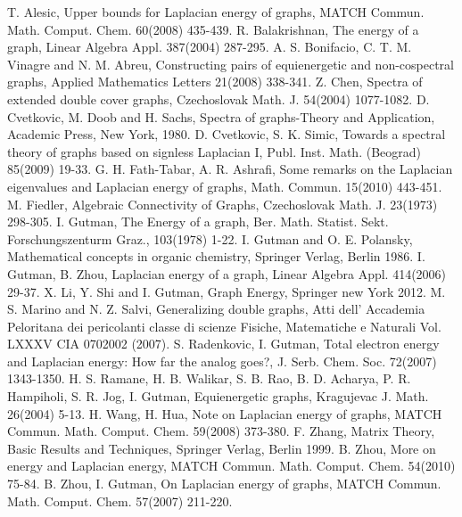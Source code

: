 \documentclass[12pt,a4paper]{amsart}
\theoremstyle{theorem}
\theoremstyle{definition}
\numberwithin{equation}{section} \makeatletter
\begin{document}
\begin{thebibliography}{90}
 T. Alesic, Upper bounds for Laplacian energy of graphs, MATCH Commun. Math. Comput. Chem. 60(2008) 435-439.
 R. Balakrishnan, The energy of a graph, Linear Algebra Appl. 387(2004) 287-295.
 A. S. Bonifacio, C. T. M. Vinagre and N. M. Abreu, Constructing pairs of equienergetic and non-cospectral graphs, Applied Mathematics Letters 21(2008) 338-341.
 Z. Chen, Spectra of extended double cover graphs, Czechoslovak Math. J. 54(2004) 1077-1082.
 D. Cvetkovic, M. Doob and H. Sachs, Spectra of graphs-Theory and Application, Academic Press, New York, 1980.
 D. Cvetkovic, S. K. Simic, Towards a spectral theory of graphs based on signless Laplacian I, Publ. Inst. Math. (Beograd) 85(2009) 19-33.
 G. H. Fath-Tabar, A. R. Ashrafi, Some remarks on the Laplacian eigenvalues and Laplacian energy of graphs, Math. Commun. 15(2010) 443-451.
 M. Fiedler, Algebraic Connectivity of Graphs, Czechoslovak Math. J. 23(1973) 298-305.
 I. Gutman, The Energy of a graph, Ber. Math. Statist. Sekt. Forschungszenturm Graz., 103(1978) 1-22.
 I. Gutman and O. E. Polansky, Mathematical concepts in organic chemistry, Springer Verlag, Berlin 1986.
 I. Gutman, B. Zhou, Laplacian energy of a graph, Linear Algebra Appl. 414(2006) 29-37.
 X. Li, Y. Shi and I. Gutman, Graph Energy, Springer new York 2012.
 M. S. Marino and N. Z. Salvi, Generalizing double graphs, Atti dell' Accademia Peloritana dei pericolanti classe di scienze Fisiche, Matematiche e Naturali Vol. LXXXV CIA 0702002 (2007).
 S. Radenkovic, I. Gutman, Total electron energy and Laplacian energy: How far the analog goes?, J. Serb. Chem. Soc. 72(2007) 1343-1350.
 H. S. Ramane, H. B. Walikar, S. B. Rao, B. D. Acharya, P. R. Hampiholi, S. R. Jog, I. Gutman, Equienergetic graphs, Kragujevac J. Math. 26(2004) 5-13.
 H. Wang, H. Hua, Note on Laplacian energy of graphs,  MATCH Commun. Math. Comput. Chem. 59(2008) 373-380.
 F. Zhang, Matrix Theory, Basic Results and Techniques, Springer Verlag, Berlin 1999.
 B. Zhou, More on energy and Laplacian energy, MATCH Commun. Math. Comput. Chem. 54(2010) 75-84.
 B. Zhou, I. Gutman, On Laplacian energy of graphs, MATCH Commun. Math. Comput. Chem. 57(2007) 211-220.

\end{thebibliography}
\end{document}
